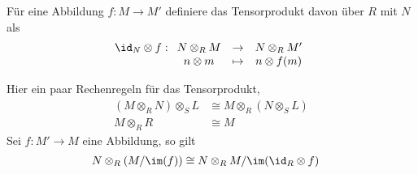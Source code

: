 \begin{defn}[Tensorprodukt]
\cite[3(Algebra).11.21]{stacks-project}

\begin{center}
\end{center}
Für eine Abbildung $f:M\rightarrow M'$ definiere das Tensorprodukt davon über
$R$ mit $N$ als
\[
\id_N \otimes f:
\begin{array}[t]{ccc}
N\otimes_{R}M & \rightarrow & N\otimes_{R}M'\\
n\otimes m & \mapsto & n\otimes f(m)
\end{array}
\]
\end{defn}
\begin{bem} \label{bem:Rechenregeln-Tensorprodukt}
Hier ein paar Rechenregeln für das Tensorprodukt,
\begin{align}
(M\otimes_R N)\otimes_S L &\cong M\otimes_R (N \otimes_S L)
  \label{bem:Rechenregeln-Tensorprodukt1}\\
M\otimes_R R &\cong M \label{bem:Rechenregeln-Tensorprodukt2}
\end{align}
Sei $f:M'\rightarrow M$ eine Abbildung, so gilt
\begin{align}
N\otimes_R(M/\im(f)) &\cong N\otimes_R M / \im(\id_{R}\otimes f)
\label{bem:Rechenregeln-Tensorprodukt3}
\end{align}
\end{bem}

